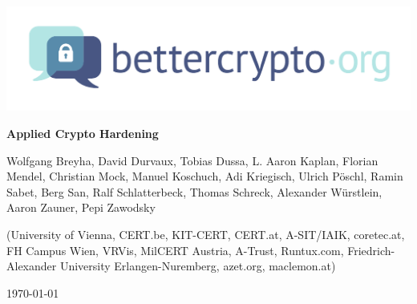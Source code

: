 \begin{titlepage}
  \begin{center}
    \includegraphics[scale=0.5]{img/logo}
    \vspace{45pt}
    \HorRule
    \medskip
    {\fontsize{35}{36} \bfseries Applied Crypto Hardening\par}
    \bigskip
  \end{center}
  \begin{flushleft}
    {\large \color{intersectgreen} Wolfgang Breyha, David Durvaux, Tobias
      Dussa, L. Aaron Kaplan, Florian Mendel, Christian Mock, Manuel Koschuch,
      Adi Kriegisch, Ulrich Pöschl, Ramin Sabet, Berg San, Ralf
      Schlatterbeck, Thomas Schreck, Alexander Würstlein, Aaron Zauner, Pepi Zawodsky
      \par}
    \bigskip
    (University of Vienna, CERT.be, KIT-CERT, CERT.at, A-SIT/IAIK, coretec.at, FH
    Campus Wien, VRVis, MilCERT Austria, A-Trust, Runtux.com,
    Friedrich-Alexander University Erlangen-Nuremberg, azet.org, maclemon.at)
  \end{flushleft}
  \medskip
  \HorRule
  \begin{center}
    \today
  \end{center}
\end{titlepage}
